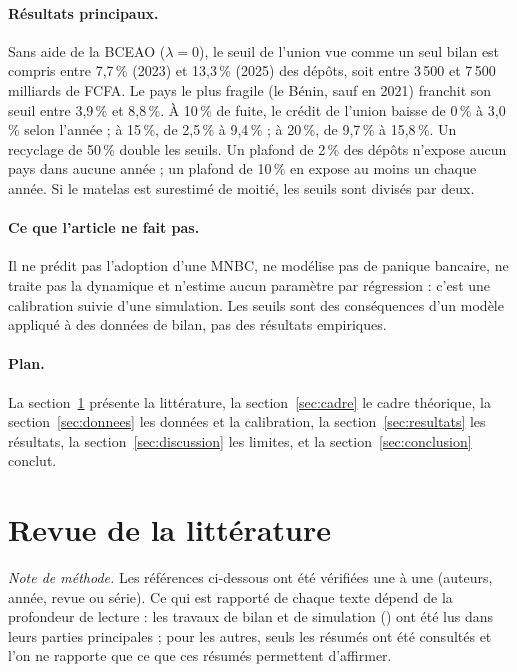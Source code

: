 \documentclass[11pt,a4paper]{article}
\begin{document}
	\paragraph{Résultats principaux.} Sans aide de la BCEAO ($\lambda=0$), le seuil de l'union vue comme un seul bilan est compris entre 7,7\,\% (2023) et 13,3\,\% (2025) des dépôts, soit entre 3\,500 et 7\,500 milliards de FCFA. Le pays le plus fragile (le Bénin, sauf en 2021) franchit son seuil entre 3,9\,\% et 8,8\,\%. À 10\,\% de fuite, le crédit de l'union baisse de 0\,\% à 3,0\,\% selon l'année ; à 15\,\%, de 2,5\,\% à 9,4\,\% ; à 20\,\%, de 9,7\,\% à 15,8\,\%. Un recyclage de 50\,\% double les seuils. Un plafond de 2\,\% des dépôts n'expose aucun pays dans aucune année ; un plafond de 10\,\% en expose au moins un chaque année. Si le matelas est surestimé de moitié, les seuils sont divisés par deux.
	
	\paragraph{Ce que l'article ne fait pas.} Il ne prédit pas l'adoption d'une MNBC, ne modélise pas de panique bancaire, ne traite pas la dynamique et n'estime aucun paramètre par régression : c'est une calibration suivie d'une simulation. Les seuils sont des conséquences d'un modèle appliqué à des données de bilan, pas des résultats empiriques.
	
	\paragraph{Plan.} La section~\ref{sec:lit} présente la littérature, la section~\ref{sec:cadre} le cadre théorique, la section~\ref{sec:donnees} les données et la calibration, la section~\ref{sec:resultats} les résultats, la section~\ref{sec:discussion} les limites, et la section~\ref{sec:conclusion} conclut.
	
	\section{Revue de la littérature}\label{sec:lit}
	
	\emph{Note de méthode.} Les références ci-dessous ont été vérifiées une à une (auteurs, année, revue ou série). Ce qui est rapporté de chaque texte dépend de la profondeur de lecture : les travaux de bilan et de simulation (\citealp{adalid2022, meller2023, fritz2024, kumhof2018, bouis2024, trinnou2023}) ont été lus dans leurs parties principales ; pour les autres, seuls les résumés ont été consultés et l'on ne rapporte que ce que ces résumés permettent d'affirmer.
	
\end{document}
